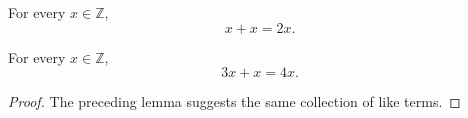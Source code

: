 \documentclass{article}
\begin{document}
\begin{lemma}\label{train:base}
For every $x\in\mathbb{Z}$,
\[x+x=2x.\]
\end{lemma}
\begin{theorem}\label{train:implicit}
For every $x\in\mathbb{Z}$,
\[3x+x=4x.\]
\end{theorem}
\begin{proof}The preceding lemma suggests the same collection of like terms.\end{proof}
\end{document}
